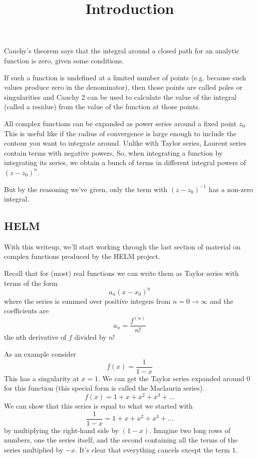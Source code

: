 \documentclass[11pt, oneside]{article}
\title{Introduction}
\date{}
\begin{document}
\maketitle
\Large

Cauchy's theorem says that the integral around a closed path for an analytic function is zero, given some conditions.

If such a function is undefined at a limited number of points (e.g. because such values produce zero in the denominator), then those points are called poles or singularities and Cauchy 2 can be used to calculate the value of the integral (called a residue) from the value of the function at those points.

All complex functions can be expanded as power series around a fixed point $z_0$.  This is useful like if the radius of convergence is large enough to include the contour you want to integrate around.  Unlike with Taylor series, Laurent series contain terms with negative powers.  So, when integrating a function by integrating its series, we obtain a bunch of terms in different integral powers of $(z-z_0)^n$.

But by the reasoning we've given, only the term with $(z-z_0)^{-1}$ has a non-zero integral.

\subsection*{HELM}

With this writeup, we'll start working through the last section of material on complex functions produced by the HELM project.

Recall that for (most) real functions we can write them as Taylor series with terms of the form
\[ a_n (x-x_0)^n \] 
where the series is summed over positive integers from $n = 0 \rightarrow \infty$ and the coefficients are
\[ a_n = \frac{f^{(n)}}{n!} \]
the nth derivative of $f$ divided by $n!$

As an example consider
\[ f(x) = \frac{1}{1 - x} \]
This has a singularity at $x = 1$.  We can get the Taylor series expanded around $0$ for this function (this special form is called the Maclaurin series).
\[ f(x) = 1 + x + x^2 + x^3 + \dots \]
We can show that this series is equal to what we started with
\[ \frac{1}{1 - x} = 1 + x + x^2 + x^3 + \dots \]
by multiplying the right-hand side by $(1-x)$.  Imagine two long rows of numbers, one the series itself, and the second containing all the terms of the series multiplied by $-x$.  It's clear that everything cancels except the term $1$.
\end{document}

